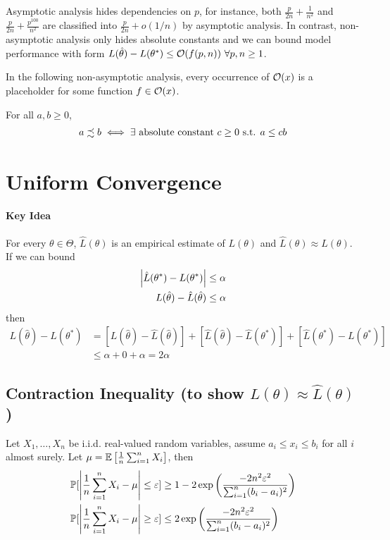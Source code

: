 \documentclass[11pt]{article}
\newcommand{\thetahat}[0]{\hat{\theta}}
\newcommand{\suchthat}[0]{\text{ s.t. }}
\newcommand{\explr}[1]{\exp\left({#1}\right)}
\begin{document}
	\begin{remark}
		Asymptotic analysis hides dependencies on $p$, for instance, both $\frac{p}{2n} + \frac{1}{n^2}$ and $ \frac{p}{2n} + \frac{p^{100}}{n^2}$ are classified into $\frac{p}{2n} + o(1/n)$ by asymptotic analysis.
		In contrast, non-asymptotic analysis only hides absolute constants and we can bound model performance with form $L(\thetahat) - L(\theta^*) \leq \mc{O}(f(p, n))\ \forall p, n \geq 1$.
	\end{remark}
	
	\begin{notation}
		In the following non-asymptotic analysis, every occurrence of $\mathcal{{O}}(x)$ is a placeholder for some function $f \in \mathcal{{O}}(x)$.
		
		For all $a, b \geq 0$,
		\begin{align}
			a \precsim b \iff \exists \tx{ absolute constant } c \geq 0 \suchthat a \leq c b
		\end{align}
	\end{notation}
	
	\section{Uniform Convergence}
	\paragraph{Key Idea} For every $\theta \in \Theta$, $\hat{L}(\theta)$ is an empirical estimate of $L(\theta)$ and $\hat{L}(\theta) \approx L(\theta)$.
	If we can bound
	\begin{align}
		\abs{\hat{L}(\theta^*) - L(\theta^*)} \leq \alpha \\
		L(\thetahat) - \hat{L}(\thetahat) \leq \alpha
	\end{align}
	then
	\begin{align}
		L(\thetahat) - L(\theta^*) &= [L(\thetahat) - \hat{L}(\thetahat)] + [\hat{L}(\thetahat) - \hat{L}(\theta^*)] + [\hat{L}(\theta^*) - L(\theta^*)] \\
		&\leq \alpha + 0 + \alpha = 2 \alpha
	\end{align}

	\subsection{Contraction Inequality (to show $L(\theta) \approx \hat{L}(\theta)$)}
	\begin{theorem}
		Let $X_1, \dots, X_n$ be i.i.d. real-valued random variables, assume $a_i \leq x_i \leq b_i$ for all $i$ almost surely. Let $\mu = \mathbb{E}\left[{\frac{1}{n} \sum_{i=1}^n X_i}\right]$, then
		\begin{align}
			\prob{\abs{\frac{1}{n} \sum_{i=1}^n X_i - \mu} \leq \varepsilon} &\geq 1 - 2 \explr{\frac{-2n^2 \varepsilon^2}{\sum_{i=1}^n (b_i - a_i)^2}} \\
			\prob{\abs{\frac{1}{n} \sum_{i=1}^n X_i - \mu} \geq \varepsilon} &\leq 2 \explr{\frac{-2n^2 \varepsilon^2}{\sum_{i=1}^n (b_i - a_i)^2}}
		\end{align}
	\end{theorem}
\end{document}
